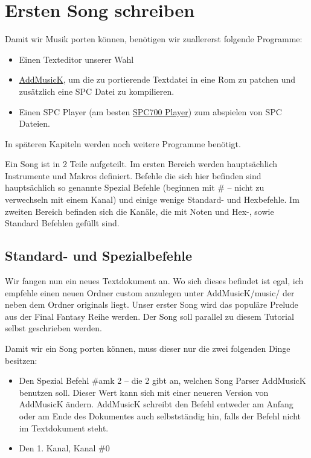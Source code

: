 \section{Ersten Song schreiben}
\label{sec:ErstenSongSchreiben}

Damit wir Musik porten können, benötigen wir zuallererst folgende Programme:
\begin{itemize}
	\item Einen Texteditor unserer Wahl
	\item \href{https://dl.smwcentral.net/24994/AddmusicK_1.0.8.zip}{AddMusicK}, um die zu portierende Textdatei in eine Rom zu patchen und zusätzlich eine SPC Datei zu kompilieren.
	\item Einen SPC Player (am besten \href{https://dl.smwcentral.net/15205/SPC700\%20PLAYER.zip}{SPC700 Player}) zum abspielen von SPC Dateien.
\end{itemize}

In späteren Kapiteln werden noch weitere Programme benötigt.

\bigskip

Ein Song ist in 2 Teile aufgeteilt. Im ersten Bereich werden hauptsächlich Instrumente und Makros definiert. Befehle die sich hier befinden sind hauptsächlich so genannte Spezial Befehle (beginnen mit \# -- nicht zu verwechseln mit einem Kanal) und einige wenige Standard- und Hexbefehle. Im zweiten Bereich befinden sich die Kanäle, die mit Noten und Hex-, sowie Standard Befehlen gefüllt sind.

\subsection{Standard- und Spezialbefehle}

Wir fangen nun ein neues Textdokument an. Wo sich dieses befindet ist egal, ich empfehle einen neuen Ordner custom anzulegen unter AddMusicK/music/ der neben dem Ordner originals liegt. Unser erster Song wird das populäre Prelude aus der Final Fantasy Reihe werden. Der Song soll parallel zu diesem Tutorial selbst geschrieben werden.

\bigskip

Damit wir ein Song porten können, muss dieser nur die zwei folgenden Dinge besitzen:
\begin{itemize}
	\item Den Spezial Befehl \#amk 2 -- die 2 gibt an, welchen Song Parser AddMusicK benutzen soll. Dieser Wert kann sich mit einer neueren Version von AddMusicK ändern. AddMusicK schreibt den Befehl entweder am Anfang oder am Ende des Dokumentes auch selbstständig hin, falls der Befehl nicht im Textdokument steht.
	\item Den 1. Kanal, Kanal \#0
\end{itemize}

